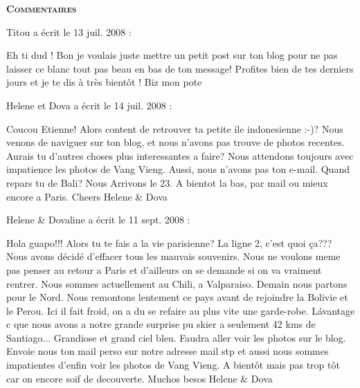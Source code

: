 \bigskip
\textbf{\textsc{Commentaires}}

\medskip
Titou a écrit le 13 juil. 2008 :
\begin{displayquote}
Eh ti dud !
Bon je voulais juste mettre un petit post sur ton blog pour ne pas laisser ce blanc tout pas beau en bas de ton message! Profites bien de tes derniers jours et je te dis à très bientôt !
Biz mon pote
\end{displayquote}

\medskip
Helene et Dova a écrit le 14 juil. 2008 :
\begin{displayquote}
Coucou Etienne!
Alors content de retrouver ta petite ile indonesienne :-)?
Nous venons de naviguer sur ton blog, et nous n'avons pas trouve de photos recentes. Aurais tu d'autres choses plus interessantes a faire?
Nous attendons toujours avec impatience les photos de Vang Vieng.
Aussi, nous n'avons pas ton e-mail.
Quand repars tu de Bali? Nous Arrivons le 23.
A bientot la bas, par mail ou mieux encore a Paris.
Cheers Helene \& Dova
\end{displayquote}

\medskip
Helene \& Dovaline a écrit le 11 sept. 2008 :
\begin{displayquote}
Hola guapo!!!
Alors tu te fais a la vie parisienne? La ligne 2, c'est quoi ça??? Nous avons décidé d'effacer tous les mauvais souvenirs. Nous ne voulons meme pas penser au retour a Paris et d'ailleurs on se demande si on va vraiment rentrer.
Nous sommes actuellement au Chili, a Valparaiso. Demain nous partons pour le Nord. Nous remontons lentement ce pays avant de rejoindre la Bolivie et le Perou. Ici il fait froid, on a du se refaire au plus vite une garde-robe. Lávantage c que nous avons a notre grande surprise pu skier a seulement 42 kms de Santiago... Grandiose et grand ciel bleu. Faudra aller voir les photos sur le blog.
Envoie nous ton mail perso sur notre adresse mail stp et aussi nous sommes impatientes d'enfin voir les photos de Vang Vieng.
A bientôt mais pas trop tôt car on encore soif de decouverte.
Muchos besos
Helene \& Dova
\end{displayquote}
